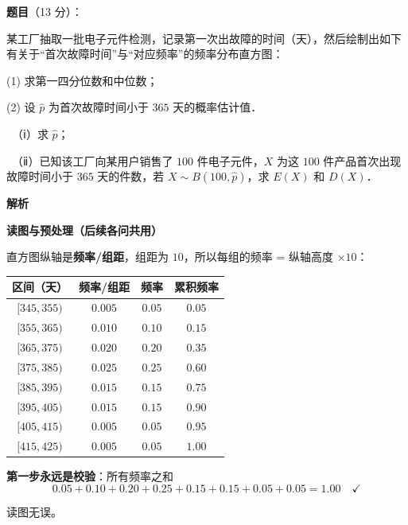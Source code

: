 \begin{answer}

\textbf{题目}（13 分）：

某工厂抽取一批电子元件检测，记录第一次出故障的时间（天），然后绘制出如下有关于“首次故障时间”与“对应频率”的频率分布直方图：
\nopagebreak[4]
\begin{center}\end{center}
\nopagebreak[4]
  (1) 求第一四分位数和中位数；

  (2) 设 $\hat{p}$ 为首次故障时间小于 $365$ 天的概率估计值．

  　（ⅰ）求 $\hat{p}$；

  　（ⅱ）已知该工厂向某用户销售了 $100$ 件电子元件，$X$ 为这 $100$ 件产品首次出现故障时间小于 $365$ 天的件数，若 $X\sim B(100,\hat{p})$，求 $E(X)$ 和 $D(X)$．

\textbf{解析}

\par\medskip

\textbf{读图与预处理（后续各问共用）}

直方图纵轴是\textbf{频率/组距}，组距为 $10$，所以每组的频率 = 纵轴高度 $\times10$：

\begin{center}
\begin{tabular}{cccc}
\toprule
区间（天） & 频率/组距 & 频率 & 累积频率 \\
\midrule
$[345,355)$ & $0.005$ & $0.05$ & $0.05$ \\
$[355,365)$ & $0.010$ & $0.10$ & $0.15$ \\
$[365,375)$ & $0.020$ & $0.20$ & $0.35$ \\
$[375,385)$ & $0.025$ & $0.25$ & $0.60$ \\
$[385,395)$ & $0.015$ & $0.15$ & $0.75$ \\
$[395,405)$ & $0.015$ & $0.15$ & $0.90$ \\
$[405,415)$ & $0.005$ & $0.05$ & $0.95$ \\
$[415,425)$ & $0.005$ & $0.05$ & $1.00$ \\
\bottomrule
\end{tabular}
\end{center}

\textbf{第一步永远是校验}：所有频率之和
\nopagebreak[4]
\[0.05+0.10+0.20+0.25+0.15+0.15+0.05+0.05=1.00\quad\checkmark\]

读图无误。

\par\medskip


\end{answer}
